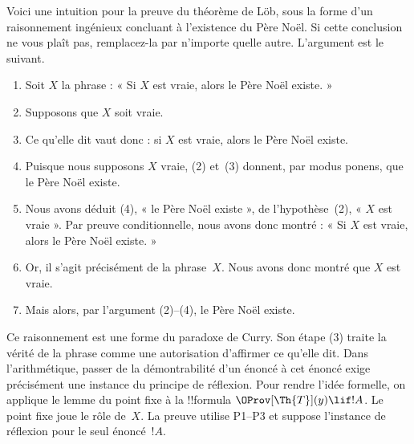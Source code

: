 \documentclass[../../../include/open-logic-section]{subfiles}
\begin{document}
\begin{explain}
Voici une intuition pour la preuve du théorème de
Löb, sous la forme d'un raisonnement ingénieux
concluant à l'existence du Père Noël. Si cette
conclusion ne vous plaît pas, remplacez-la par
n'importe quelle autre. L'argument est le suivant.
\begin{enumerate}
\item Soit $X$ la phrase : « Si $X$ est vraie,
  alors le Père Noël existe. »
\item Supposons que $X$ soit vraie.
\item Ce qu'elle dit vaut donc : si $X$ est vraie,
  alors le Père Noël existe.
\item Puisque nous supposons $X$ vraie, (2) et~(3)
  donnent, par modus ponens, que le Père Noël existe.
\item Nous avons déduit (4), « le Père Noël existe »,
  de l'hypothèse~(2), « $X$ est vraie ». Par preuve
  conditionnelle, nous avons donc montré :
  « Si $X$ est vraie, alors le Père Noël existe. »
\item Or, il s'agit précisément de la phrase~$X$.
  Nous avons donc montré que $X$ est vraie.
\item Mais alors, par l'argument (2)--(4), le
  Père Noël existe.
\end{enumerate}
Ce raisonnement est une forme du paradoxe de Curry. Son
étape (3) traite la vérité de la phrase comme une autorisation
d'affirmer ce qu'elle dit. Dans l'arithmétique, passer de la
démontrabilité d'un énoncé à cet énoncé exige précisément une
instance du principe de réflexion. Pour rendre l'idée formelle,
on applique le lemme du point fixe à la !!{formula}
$\OProv[\Th{T}](y)\lif !A$. Le point fixe joue le rôle de~$X$.
La preuve utilise P1--P3 et suppose l'instance de réflexion
pour le seul énoncé~$!A$.
\end{explain}
\end{document}
